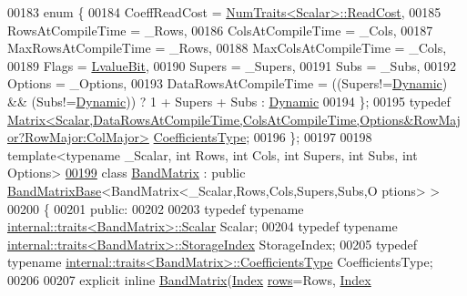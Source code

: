 \begin{DoxyCode}
00183   \textcolor{keyword}{enum} \{
00184     CoeffReadCost = \hyperlink{group___core___module_struct_eigen_1_1_num_traits}{NumTraits<Scalar>::ReadCost},
00185     RowsAtCompileTime = \_Rows,
00186     ColsAtCompileTime = \_Cols,
00187     MaxRowsAtCompileTime = \_Rows,
00188     MaxColsAtCompileTime = \_Cols,
00189     Flags = \hyperlink{group__flags_gae2c323957f20dfdc6cb8f44428eaec1a}{LvalueBit},
00190     Supers = \_Supers,
00191     Subs = \_Subs,
00192     Options = \_Options,
00193     DataRowsAtCompileTime = ((Supers!=\hyperlink{namespace_eigen_ad81fa7195215a0ce30017dfac309f0b2}{Dynamic}) && (Subs!=\hyperlink{namespace_eigen_ad81fa7195215a0ce30017dfac309f0b2}{Dynamic})) ? 1 + Supers + Subs : 
      \hyperlink{namespace_eigen_ad81fa7195215a0ce30017dfac309f0b2}{Dynamic}
00194   \};
00195   \textcolor{keyword}{typedef} 
      \hyperlink{group___core___module_class_eigen_1_1_matrix}{Matrix<Scalar,DataRowsAtCompileTime,ColsAtCompileTime,Options&RowMajor?RowMajor:ColMajor>}
       \hyperlink{group___core___module_class_eigen_1_1_matrix}{CoefficientsType};
00196 \};
00197 
00198 \textcolor{keyword}{template}<\textcolor{keyword}{typename} \_Scalar, \textcolor{keywordtype}{int} Rows, \textcolor{keywordtype}{int} Cols, \textcolor{keywordtype}{int} Supers, \textcolor{keywordtype}{int} Subs, \textcolor{keywordtype}{int} Options>
\hyperlink{group___core___module}{00199} \textcolor{keyword}{class }\hyperlink{group___core___module_class_eigen_1_1internal_1_1_band_matrix}{BandMatrix} : \textcolor{keyword}{public} \hyperlink{class_eigen_1_1internal_1_1_band_matrix_base}{BandMatrixBase}<BandMatrix<\_Scalar,Rows,Cols,Supers,Subs,O
      ptions> >
00200 \{
00201   \textcolor{keyword}{public}:
00202 
00203     \textcolor{keyword}{typedef} \textcolor{keyword}{typename} \hyperlink{struct_eigen_1_1internal_1_1traits}{internal::traits<BandMatrix>::Scalar} Scalar;
00204     \textcolor{keyword}{typedef} \textcolor{keyword}{typename} \hyperlink{struct_eigen_1_1internal_1_1traits}{internal::traits<BandMatrix>::StorageIndex} 
      StorageIndex;
00205     \textcolor{keyword}{typedef} \textcolor{keyword}{typename} \hyperlink{struct_eigen_1_1internal_1_1traits}{internal::traits<BandMatrix>::CoefficientsType}
       CoefficientsType;
00206 
00207     \textcolor{keyword}{explicit} \textcolor{keyword}{inline} \hyperlink{group___core___module_class_eigen_1_1internal_1_1_band_matrix}{BandMatrix}(\hyperlink{namespace_eigen_a62e77e0933482dafde8fe197d9a2cfde}{Index} \hyperlink{group___core___module_a8141320ba8df384426c298b32b000d8e}{rows}=Rows, \hyperlink{namespace_eigen_a62e77e0933482dafde8fe197d9a2cfde}{Index} 

\end{DoxyCode}
